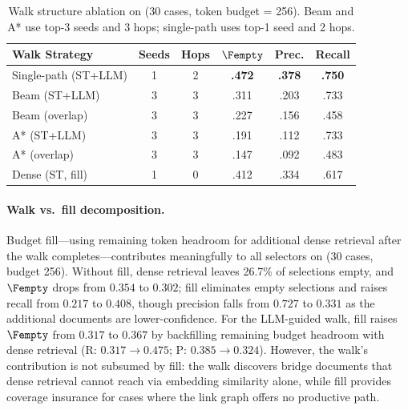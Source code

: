 \begin{table}[t]
\centering
\caption{Walk structure ablation on \TwoWikiShort (30 cases, token budget = 256).
Beam and A* use top-3 seeds and 3 hops; single-path uses top-1 seed and 2 hops.}
\label{tab:walk-structure}
\small
\setlength{\tabcolsep}{4pt}
\begin{tabular}{@{}lccccc@{}}
\toprule
\textbf{Walk Strategy} & \textbf{Seeds} & \textbf{Hops}
  & \textbf{$\Fempty$} & \textbf{Prec.} & \textbf{Recall} \\
\midrule
Single-path (ST+LLM) & 1 & 2 & \textbf{.472} & \textbf{.378} & \textbf{.750} \\
Beam (ST+LLM)        & 3 & 3 & .311 & .203 & .733 \\
Beam (overlap)        & 3 & 3 & .227 & .156 & .458 \\
A* (ST+LLM)          & 3 & 3 & .191 & .112 & .733 \\
A* (overlap)          & 3 & 3 & .147 & .092 & .483 \\
\midrule
Dense (ST, fill)      & 1 & 0 & .412 & .334 & .617 \\
\bottomrule
\end{tabular}
\end{table}

\paragraph{Walk vs.\ fill decomposition.}
Budget fill---using remaining token headroom for additional dense
retrieval after the walk completes---contributes meaningfully to all
selectors on \TwoWikiShort (30 cases, budget 256).
Without fill, dense retrieval leaves 26.7\% of selections empty,
and $\Fempty$ drops from $0.354$ to $0.302$; fill eliminates
empty selections and raises recall from $0.217$ to $0.408$, though
precision falls from $0.727$ to $0.331$ as the additional documents
are lower-confidence.
For the LLM-guided walk, fill raises $\Fempty$ from $0.317$ to
$0.367$ by backfilling remaining budget headroom with dense retrieval
($\mathrm{R}$: $0.317 \to 0.475$; $\mathrm{P}$: $0.385 \to 0.324$).
However, the walk's contribution is not subsumed by fill:
the walk discovers bridge documents that dense retrieval cannot reach
via embedding similarity alone, while fill provides coverage insurance
for cases where the link graph offers no productive path.

